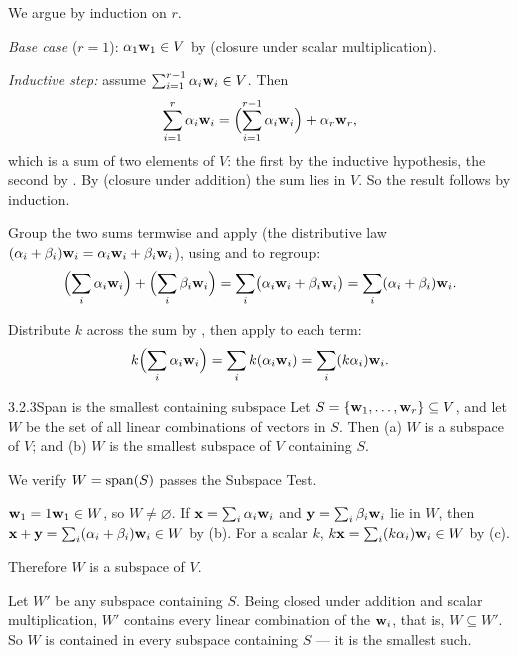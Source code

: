 \begin{prf}
 We argue by induction on $r$.

\emph{Base case} ($r=1$): $\alpha_1\mathbf{w}_1\in V$ by  (closure under scalar multiplication).

\emph{Inductive step:} assume $\sum_{i=1}^{r-1}\alpha_i\mathbf{w}_i\in V$. Then
\[
\sum_{i=1}^r\alpha_i\mathbf{w}_i=\Bigl(\sum_{i=1}^{r-1}\alpha_i\mathbf{w}_i\Bigr)+\alpha_r\mathbf{w}_r,
\]
which is a sum of two elements of $V$: the first by the inductive hypothesis, the second by . By  (closure under addition) the sum lies in $V$. So the result follows by induction.

 Group the two sums termwise and apply  (the distributive law $(\alpha_i+\beta_i)\mathbf{w}_i=\alpha_i\mathbf{w}_i+\beta_i\mathbf{w}_i$), using  and  to regroup:
\[
\Bigl(\sum_i\alpha_i\mathbf{w}_i\Bigr)+\Bigl(\sum_i\beta_i\mathbf{w}_i\Bigr)=\sum_i\bigl(\alpha_i\mathbf{w}_i+\beta_i\mathbf{w}_i\bigr)=\sum_i(\alpha_i+\beta_i)\mathbf{w}_i.
\]

 Distribute $k$ across the sum by , then apply  to each term:
\[
k\Bigl(\sum_i\alpha_i\mathbf{w}_i\Bigr)=\sum_i k(\alpha_i\mathbf{w}_i)=\sum_i(k\alpha_i)\mathbf{w}_i.
\]
\end{prf}

\begin{thms}{3.2.3}{Span is the smallest containing subspace}
Let $S=\{\mathbf{w}_1,\dots,\mathbf{w}_r\}\subseteq V$, and let $W$ be the set of all linear combinations of vectors in $S$. Then
\textup{(a)} $W$ is a subspace of $V$; and
\textup{(b)} $W$ is the smallest subspace of $V$ containing $S$.
\end{thms}

\begin{prf}
 We verify $W=\operatorname{span}(S)$ passes the Subspace Test.
\begin{checks}
 $\mathbf{w}_1=1\mathbf{w}_1\in W$, so $W\neq\varnothing$.
 If $\mathbf{x}=\sum_i\alpha_i\mathbf{w}_i$ and $\mathbf{y}=\sum_i\beta_i\mathbf{w}_i$ lie in $W$, then $\mathbf{x}+\mathbf{y}=\sum_i(\alpha_i+\beta_i)\mathbf{w}_i\in W$ by (b).
 For a scalar $k$, $k\mathbf{x}=\sum_i(k\alpha_i)\mathbf{w}_i\in W$ by (c).
\end{checks}
Therefore $W$ is a subspace of $V$.

 Let $W'$ be any subspace containing $S$. Being closed under addition and scalar multiplication, $W'$ contains every linear combination of the $\mathbf{w}_i$, that is, $W\subseteq W'$. So $W$ is contained in every subspace containing $S$ --- it is the smallest such.
\end{prf}

